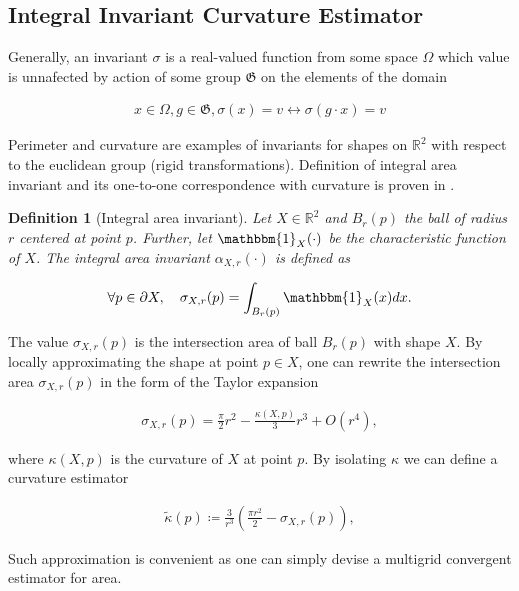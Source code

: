 \documentclass[runningheads]{llncs}
\newtheorem{ddef}{Definition}
\begin{document}
\subsection{Integral Invariant Curvature Estimator}
Generally, an invariant $\sigma$ is a real-valued function from some space $\Omega$ which value is unnafected by action of some group $\mathfrak{G}$ on the elements of the domain
		
		\begin{align*}
			x \in \Omega, g \in \mathfrak{G}, \sigma(x) = v \longleftrightarrow \sigma(g \cdot x ) = v
		\end{align*}
		
		Perimeter and curvature are examples of invariants for shapes on $\mathbb{R}^2$ with respect to the euclidean group (rigid transformations). Definition of integral area invariant and its one-to-one correspondence with curvature is proven in \cite{manay04}.


\begin{ddef}[Integral area invariant]
	Let $X \in \mathbb{R}^2$ and $B_r(p)$ the ball of radius $r$ centered at point $p$. Further, let $\mathbbm{1}_X(\cdot)$ be the characteristic function of $X$. The integral area invariant $\alpha_{X,r}(\cdot)$ is defined as
	
	\begin{align*}
		\forall p \in \partial X, \quad \sigma_{X,r}(p) = \int_{B_r(p)}{ \mathbbm{1}_X(x) dx}.
	\end{align*}
\end{ddef}


	The value $\sigma_{X,r}(p)$ is the intersection area of ball $B_r(p)$ with shape $X$. By locally approximating the shape at point $p \in X$, one can rewrite the intersection area $\sigma_{X,r}(p)$ in the form of the Taylor expansion \cite{pottman09}
	
		\begin{align*}
			\sigma_{X,r}(p) = \frac{\pi}{2}r^2 - \frac{\kappa(X,p)}{3}r^3 + O(r^4),
		\end{align*}
		
	where $\kappa(X,p)$ is the curvature of $X$ at point $p$. By isolating $\kappa$ we can define a curvature estimator
	
	\begin{align}
		\tilde{\kappa}(p) \coloneqq \frac{3}{r^3}\left( \frac{\pi r^2}{2} - \sigma_{X,r}(p) \right),
		\label{eq:curvature_approximation}
	\end{align}
	
	Such approximation is convenient as one can simply devise a multigrid convergent estimator for area.
\end{document}
